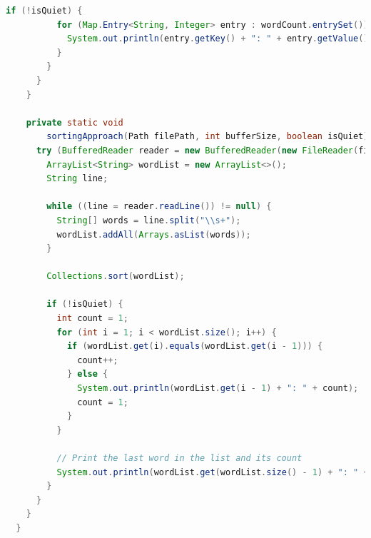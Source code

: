 \documentclass{article}
\begin{document}
\begin{lstlisting}[language=Java, 
  basicstyle=\ttfamily\scriptsize, 
  numbers=none, 
  frame=single,
  showspaces=false,
  caption={Source Code for the WordFrequencyCounter.java file.}]
        if (!isQuiet) {
          for (Map.Entry<String, Integer> entry : wordCount.entrySet()) {
            System.out.println(entry.getKey() + ": " + entry.getValue());
          }
        }
      }
    }
  
    private static void
        sortingApproach(Path filePath, int bufferSize, boolean isQuiet) throws IOException {
      try (BufferedReader reader = new BufferedReader(new FileReader(filePath.toFile()), bufferSize)) {
        ArrayList<String> wordList = new ArrayList<>();
        String line;
  
        while ((line = reader.readLine()) != null) {
          String[] words = line.split("\\s+");
          wordList.addAll(Arrays.asList(words));
        }
  
        Collections.sort(wordList);
  
        if (!isQuiet) {
          int count = 1;
          for (int i = 1; i < wordList.size(); i++) {
            if (wordList.get(i).equals(wordList.get(i - 1))) {
              count++;
            } else {
              System.out.println(wordList.get(i - 1) + ": " + count);
              count = 1;
            }
          }
  
          // Print the last word in the list and its count
          System.out.println(wordList.get(wordList.size() - 1) + ": " + count);
        }
      }
    }
  }  
\end{lstlisting}

\clearpage
\end{document}
